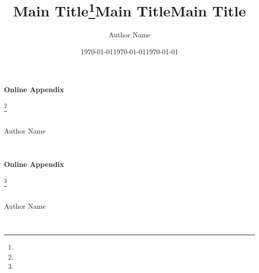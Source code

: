 \documentclass{article}
\title{Main Title\thanks{\blindtext}}
\author{Author Name}
\date{\today}
\begin{document}
\maketitle
\begin{abstract}
\blindtext
\end{abstract}

\newpage

\renewcommand*{\thefootnote}{\fnsymbol{footnote}}

\begin{titlepage}
    \centering
    {\LARGE \textbf{Online Appendix}}\\ [4em]
    {\LARGE \title{Main Title}\footnote[2]{\blindtext}}\\ [1.5em]
    {\large Author Name}\\ [1em]
    {\large \date{\today}}\\ [4em]

\begin{abstract}
    \blindtext
\end{abstract}

\vfill

\end{titlepage}

\begin{center}
    {\LARGE \textbf{Online Appendix}}\\ [4em]
    {\LARGE \title{Main Title}\footnote[2]{\blindtext}}\\ [1.5em]
    {\large Author Name}\\ [1em]
    {\large \date{\today}}\\ [4em]

\begin{abstract}
    \blindtext
\end{abstract}

\vfill
\end{center}
\end{document}
